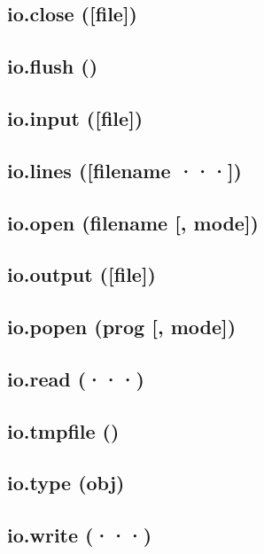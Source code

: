 \documentclass[12pt]{article}
\begin{document}
\subsection{io.close ([file])}

\subsection{io.flush ()}

\subsection{io.input ([file])}

\subsection{io.lines ([filename ···])}

\subsection{io.open (filename [, mode])}

\subsection{io.output ([file])}

\subsection{io.popen (prog [, mode])}

\subsection{io.read (···)}

\subsection{io.tmpfile ()}

\subsection{io.type (obj)}

\subsection{io.write (···)}

\newpage
\end{document}
